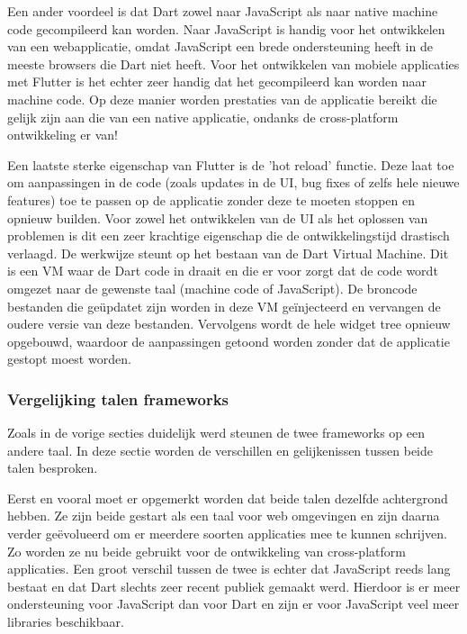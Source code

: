 Een ander voordeel is dat Dart zowel naar JavaScript als naar native machine
code gecompileerd kan worden. Naar JavaScript is handig voor het ontwikkelen van
een webapplicatie, omdat JavaScript een brede ondersteuning heeft in de meeste
browsers die Dart niet heeft. Voor het ontwikkelen van mobiele applicaties met
Flutter is het echter zeer handig dat het gecompileerd kan worden naar machine
code. Op deze manier worden prestaties van de applicatie bereikt die gelijk zijn
aan die van een native applicatie, ondanks de cross-platform ontwikkeling er
van!

Een laatste sterke eigenschap van Flutter is de 'hot reload' functie. Deze laat
toe om aanpassingen in de code (zoals updates in de UI, bug fixes of zelfs hele
nieuwe features) toe te passen op de applicatie zonder deze te moeten stoppen en
opnieuw builden. Voor zowel het ontwikkelen van de UI als het oplossen van
problemen is dit een zeer krachtige eigenschap die de ontwikkelingstijd drastisch
verlaagd. De werkwijze steunt op het bestaan van de Dart Virtual Machine. Dit is
een VM waar de Dart code in draait en die er voor zorgt dat de code wordt
omgezet naar de gewenste taal (machine code of JavaScript). De broncode
bestanden die geüpdatet zijn worden in deze VM geïnjecteerd en vervangen de
oudere versie van deze bestanden. Vervolgens wordt de hele widget tree opnieuw
opgebouwd, waardoor de aanpassingen getoond worden zonder dat de applicatie
gestopt moest worden.

\subsubsection{Vergelijking talen frameworks}
\label{subsubse:vglTalen}

Zoals in de vorige secties duidelijk werd steunen de twee frameworks op een
andere taal. In deze sectie worden de verschillen en gelijkenissen tussen beide
talen besproken.

Eerst en vooral moet er opgemerkt worden dat beide talen dezelfde achtergrond
hebben. Ze zijn beide gestart als een taal voor web omgevingen en zijn daarna
verder geëvolueerd om er meerdere soorten applicaties mee te kunnen schrijven.
Zo worden ze nu beide gebruikt voor de ontwikkeling van cross-platform
applicaties. Een groot verschil tussen de twee is echter dat JavaScript reeds
lang bestaat en dat Dart slechts zeer recent publiek gemaakt werd. Hierdoor is
er meer ondersteuning voor JavaScript dan voor Dart en zijn er voor JavaScript
veel meer libraries beschikbaar.

